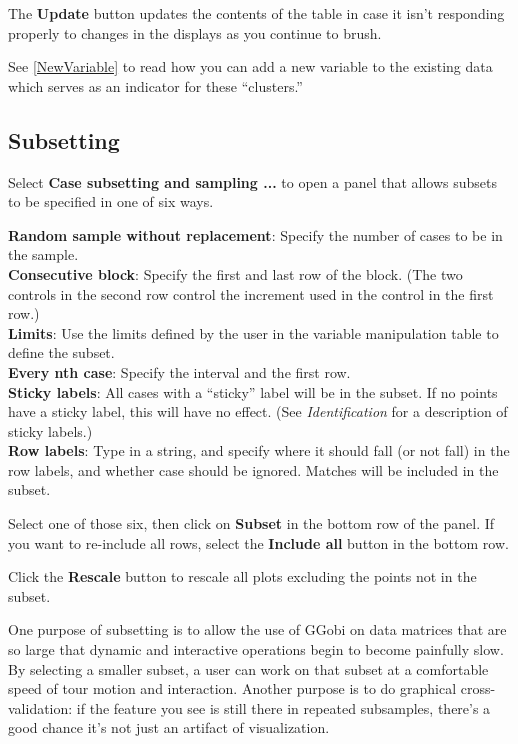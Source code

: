 \documentclass[11pt]{article}
\begin{document}
The {\bf Update} button updates the contents of the table in case it
isn't responding properly to changes in the displays as you continue
to brush.


See \ref{NewVariable} to read how you can add a new variable to the
existing data which serves as an indicator for these ``clusters.''

\subsection{Subsetting}

Select {\bf Case subsetting and sampling ...} to open a panel
that allows subsets to be specified in one of six ways.

{\bf Random sample without replacement}:  Specify the number of
     cases to be in the sample.
\\{\bf Consecutive block}:  Specify the first and last row of the block.
     (The two controls in the second row control the increment used
     in the control in the first row.)
\\{\bf Limits}:  Use the limits defined by the user in the variable
     manipulation table to define the subset.
\\{\bf Every nth case}:  Specify the interval and the first row.
\\{\bf Sticky labels}:  All cases with a ``sticky'' label will
  be in the subset.  If no points have a sticky label, this
  will have no effect. (See {\em Identification} for a description
  of sticky labels.)
\\{\bf Row labels}: Type in a string, and specify where it should
  fall (or not fall) in the row labels, and whether case should
  be ignored.  Matches will be included in the subset.

Select one of those six, then click on {\bf Subset} in the
bottom row of the panel.  If you want to re-include all rows, 
select the {\bf Include all} button in the bottom row.

Click the {\bf Rescale} button to rescale all plots excluding
the points not in the subset.

One purpose of subsetting is to allow the use of GGobi on data matrices
that are so large that dynamic and interactive operations begin to
become painfully slow.  By selecting a smaller subset, a user can
work on that subset at a comfortable speed of tour motion and
interaction.  Another purpose is to do graphical cross-validation:
if the feature you see is still there in repeated subsamples, there's
a good chance it's not just an artifact of visualization.
\end{document}
